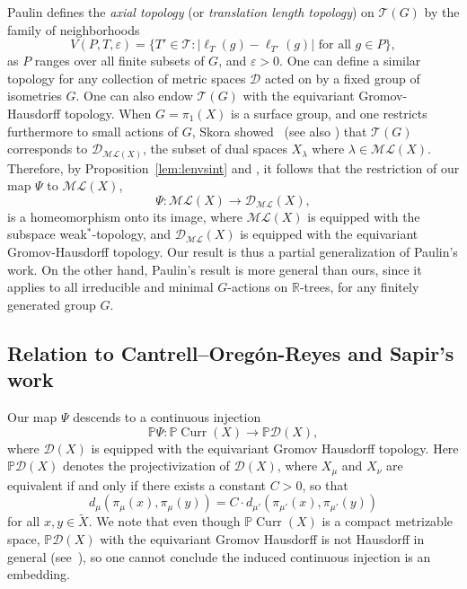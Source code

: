 \documentclass[12pt,article]{amsart}
\numberwithin{equation}{section}
\numberwithin{figure}{section}
\theoremstyle{definition}
\theoremstyle{plain}
\DeclareMathOperator{\Curr}{Curr}
\newcommand*{\wt}[1]{\widetilde{#1}}
\renewcommand{\epsilon}{\varepsilon}
\newcommand{\ML}{\mathcal{ML}}
\begin{document}
Paulin defines the \emph{axial topology} (or \emph{translation length topology}) on $\mathcal{T}(G)$ by the family of neighborhoods
\[
V(P,T,\epsilon)=\{ T' \in \mathcal{T} \colon | \ell_T(g)-\ell_{T'}(g)| \mbox{ for all } g \in P \},
\]
as $P$ ranges over all finite subsets of $G$, and $\epsilon>0$. One can define a similar topology for any collection of metric spaces $\mathcal{D}$ acted on by a fixed group of isometries $G$.
One can also endow $\mathcal{T}(G)$ with the equivariant Gromov-Hausdorff topology.
When $G=\pi_1(X)$ is a surface group, and one restricts furthermore to small actions of $G$, Skora showed~\cite[Theorem~3.3]{S90:GeometricAction} (see also \cite[13.6]{Hub22:Vol3}) that
 $\mathcal{T}(G)$ corresponds to $\mathcal{D}_{\ML(X)}$, the subset of dual spaces $X_{\lambda}$ where $\lambda \in \ML(X)$. 
Therefore, by Proposition~\ref{lem:lenvsint} and \cite[Main~Theorem]{Pa89:Paulin1989TheGT}, it follows that the restriction of our map $\Psi$ to $\ML(X)$,
\[
\Psi \colon \ML(X) \to \mathcal{D}_{\ML}(X),
\]
is a homeomorphism onto its image, where $\ML(X)$ is equipped with the subspace weak$^*$-topology, and $\mathcal{D}_{\ML}(X)$ is equipped with the equivariant Gromov-Hausdorff topology.
Our result is thus a partial generalization of Paulin's work.
On the other hand, Paulin's result is more general than ours, since it applies to all irreducible and minimal $G$-actions on $\mathbb{R}$-trees, for any finitely generated group $G$.

\subsection{Relation to Cantrell--Oreg\'on-Reyes and Sapir's work}

Our map $\Psi$ descends to a continuous injection
\[
\mathbb{P}\Psi \colon \mathbb{P}\Curr(X) \to \mathbb{P}\mathcal{D}(X),
\]
where $\mathcal{D}(X)$ is equipped with the equivariant Gromov Hausdorff topology. Here $\mathbb{P}\mathcal{D}(X)$ denotes the projectivization of $\mathcal{D}(X)$, where $X_{\mu}$ and $X_{\nu}$ are equivalent if and only if there exists a constant $C>0$, so that 
\[d_{\mu}(\pi_{\mu}(x), \pi_{\mu}(y))=C \cdot d_{\mu'}(\pi_{\mu'}(x), \pi_{\mu'}(y))\] for all $x,y \in \wt{X}$.
We note that even though $\mathbb{P}\Curr(X)$ is a compact metrizable space, $\mathbb{P}\mathcal{D}(X)$ with the equivariant Gromov Hausdorff is not Hausdorff in general (see~\cite[Chapter~4]{Pau88:Thesis}), so one cannot conclude the induced continuous injection is an embedding.
\end{document}
